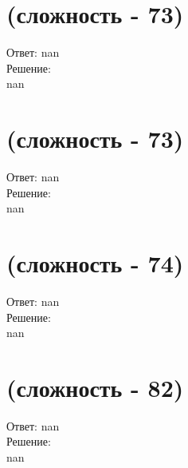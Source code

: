 \documentclass[a4paper,11pt]{article}%
\begin{document}
%
\section{(сложность {-} 73)}%
\label{sec:( {-} 73)}%
\hspace{3ex} Ответ: nan \\%
%
\hspace*{3ex} Решение: \\%
nan

%
\section{(сложность {-} 73)}%
\label{sec:( {-} 73)}%
\hspace{3ex} Ответ: nan \\%
%
\hspace*{3ex} Решение: \\%
nan

%
\section{(сложность {-} 74)}%
\label{sec:( {-} 74)}%
\hspace{3ex} Ответ: nan \\%
%
\hspace*{3ex} Решение: \\%
nan

%
\section{(сложность {-} 82)}%
\label{sec:( {-} 82)}%
\hspace{3ex} Ответ: nan \\%
%
\hspace*{3ex} Решение: \\%
nan

%
\end{document}
